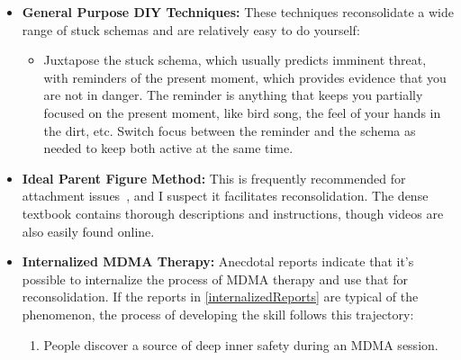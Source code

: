 \documentclass[11pt,oneside]{book}
\let\cite\parencite
\begin{document}
\begin{itemize}
    Increasing attention and non-avoidance in the days to weeks following an MDMA therapy session may be especially productive for two reasons. First, some people report a 1--2\,week afterglow period (see \cref{afterglow}) where reconsolidation exercises feel easier. Second, MDMA-facilitated reconsolidation reduces the strength of the elements reinforcing stuck states of mental illness (see \cref{sec:complex}). The brain's natural updating process might now have the capacity to make further shifts as long as attention is devoted to your stuck schemas. I think this may be why MDMA therapy practitioners commonly recommend clients take time after a session for \textit{integration} activities. These include meditation, yoga, journaling, making art about feelings, walking in nature to spend time with yourself, massage, listening to a recording of your session, singing, dancing, and breathing exercises~\cite{mithoeferManual}.
    \item \textbf{General Purpose DIY Techniques:} These techniques reconsolidate a wide range of stuck schemas and are relatively easy to do yourself:
    \begin{itemize}
        \item Juxtapose the stuck schema, which usually predicts imminent threat, with reminders of the present moment, which provides evidence that you are not in danger. The reminder is anything that keeps you partially focused on the present moment, like bird song, the feel of your hands in the dirt, etc. Switch focus between the reminder and the schema as needed to keep both active at the same time. 
    \end{itemize}
    \item \textbf{Ideal Parent Figure Method:} \label{def:ipf} This is frequently recommended for attachment issues~\cite{brownAttachmentDisturbances}, and I suspect it facilitates reconsolidation. The dense textbook \textcite{brownAttachmentDisturbances} contains thorough descriptions and instructions, though videos are also easily found online.
	\item \textbf{Internalized MDMA Therapy:} Anecdotal reports indicate that it's possible to internalize the process of MDMA therapy and use that for reconsolidation. If the reports in \cref{internalizedReports} are typical of the phenomenon, the process of developing the skill follows this trajectory:
	\begin{enumerate}
        \item People discover a source of deep inner safety during an MDMA session.

\end{enumerate}
\end{itemize}
\end{document}
